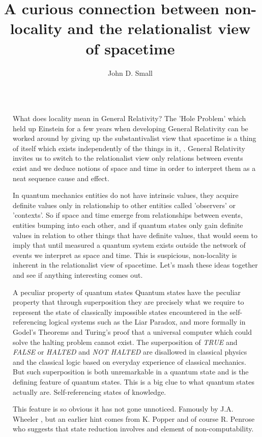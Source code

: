 \documentclass[final]{beamer}
\title{A curious connection between non-locality and the relationalist view of spacetime}
\author{John D. Small}
\newlength{\sepwidth}
\newlength{\colwidth}
\newcommand{\separatorcolumn}{\begin{column}{\sepwidth}\end{column}}
\begin{document}
\begin{frame}[t]
\begin{columns}[t]
\separatorcolumn

\begin{column}{\colwidth}
  \begin{block}{What does locality mean in General Relativity?}
    The 'Hole Problem' which held up Einstein for a few years when developing General Relativity can be worked around by giving up the substantivalist view that spacetime is a thing of itself which exists independently of the things in it, \autocite{Stachel2014TheImplications, NortonTheArgument}. General Relativity invites us to switch to the relationalist view only relations between events exist and we deduce notions of space and time in order to interpret them as a neat sequence cause and effect. 

    In quantum mechanics entities do not have intrinsic values, they acquire definite values only in relationship to other entities called 'observers' or 'contexts'. So if space and time emerge from relationships between events, entities bumping into each other, and if quantum states only gain definite values in relation to other things that have definite values, that would seem to imply that until measured a quantum system exists outside the network of events we interpret as space and time. This is suspicious, non-locality is inherent in the relationalist view of spacetime. Let's mash these ideas together and see if anything interesting comes out. 
\end{block}

\begin{block}{A peculiar property of quantum states}
    Quantum states have the peculiar property that through superposition they are precisely what we require to represent the state of classically impossible states encountered in the self-referencing logical systems such as the Liar Paradox, and more formally in Godel's Theorems and Turing's proof that a universal computer which could solve the halting problem cannot exist. The superposition of \textit{TRUE} and \textit{FALSE} or \textit{HALTED} and \textit{NOT HALTED} are disallowed in classical physics and the classical logic based on everyday experience of classical mechanics. But such superposition is both unremarkable in a quantum state and is the defining feature of quantum states. This is a big clue to what quantum states actually are. Self-referencing states of knowledge. 

    This feature is so obvious it has not gone unnoticed. Famously by J.A. Wheeler \autocite{Wheeler1974}, but an earlier hint comes from K. Popper \autocite{Popper1950IndeterminismI, Popper1950IndeterminismII}  and of course R. Penrose \autocite{Penrose1996} who suggests that state reduction involves and element of non-computability. 
\end{block}


\end{column}
\end{columns}
\end{frame}
\end{document}

